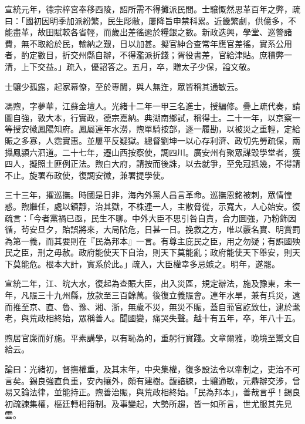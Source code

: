 \begin{pinyinscope}
宣統元年，德宗梓宮奉移西陵，詔所需不得攤派民間。士驤慨然思革百年之弊，疏曰：「國初因明季加派紛繁，民生彫敝，屢降旨申禁科累。近畿繁劇，供億多，不能盡革，故田賦較各省輕，而歲出差徭逾於糧銀之數。新政迭興，學堂、巡警諸費，無不取給於民，輸納之艱，日以加甚。擬官紳合查常年應官差徭，實系公用者，酌定數目，折交州縣自辦，不得濫派折錢；胥役書差，官給津貼。庶積弊一清，上下交益。」疏入，優詔答之。五月，卒，贈太子少保，謚文敬。

士驤少孤露，起家幕僚，至於專閫，與人無迕，眾皆稱其通敏云。

馮煦，字夢華，江蘇金壇人。光緒十二年一甲三名進士，授編修。疊上疏代奏，請圖自強，敦大本，行實政，德宗嘉納。典湖南鄉試，稱得士。二十一年，以京察一等授安徽鳳陽知府。鳳屬連年水澇，煦單騎按部，逐一履勘，以被災之重輕，定給賑之多寡，人霑實惠。並屢平反疑獄。總督劉坤一以心存利濟、政切先勞疏保，兩攝鳳潁六泗道。二十七年，遷山西按察使，調四川。廣安州有聚眾謀毀學堂者，獲四人，擬照土匪例正法。煦白大府，請按而後誅，以去就爭，至免冠抵幾，不得請不止。旋署布政使，復調安徽，兼署提學使。

三十三年，擢巡撫。時國是日非，海內外黨人昌言革命。巡撫恩銘被刺，眾情惶惑。煦繼任，處以鎮靜，治其獄，不株連一人，主散脅從，示寬大，人心始安。復疏言：「今者黨禍已亟，民生不聊。中外大臣不思引咎自責，合力圖強，乃粉飾因循，茍安旦夕，貽誤將來，大局阽危，日甚一日。挽救之方，唯以覈名實、明賞罰為第一義，而其要則在『民為邦本』一言。有尊主庇民之臣，用之勿疑；有誤國殃民之臣，刑之毋赦。政府能使天下自治，則天下莫能亂；政府能使天下舉安，則天下莫能危。根本大計，實系於此。」疏入，大臣權幸多忌嫉之。明年，遂罷。

宣統二年，江、皖大水，復起為查賑大臣，出入災區，規定辦法，施及豫東，未一年，凡賑三十九州縣，放款至三百餘萬。後復立義賑會。連年水旱，兼有兵災，遠而推至京、直、魯、豫、湘、浙，無歲不災，無災不賑，蓋自蒞官訖致仕，逮於耄老，與荒政相終始，眾稱善人。聞國變，痛哭失聲。越十有五年，卒，年八十五。

煦居官廉而好施。平素講學，以有恥為的，重躬行實踐。文章爾雅，晚境至鬻文自給云。

論曰：光緒初，督撫權重，及其末年，中央集權，復多設法令以牽制之，吏治不可言矣。錫良強直負重，安內攘外，頗有建樹。馥諳練，士驤通敏，元鼎辦交涉，曾易又論法律，並能持正。煦善治賑，與荒政相終始。「民為邦本」，善哉言乎！錫良初疏諫集權，樞廷轉相箝制。及事變起，大勢所趨，皆一如所言，世尤服其先見雲。


\end{pinyinscope}